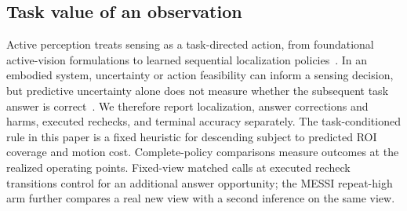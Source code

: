 

\subsection{Task value of an observation}
Active perception treats sensing as a task-directed action, from foundational active-vision formulations to learned sequential localization policies~\cite{bajcsy1988active,aloimonos1988active,caicedo2015active}. In an embodied system, uncertainty or action feasibility can inform a sensing decision, but predictive uncertainty alone does not measure whether the subsequent task answer is correct~\cite{ren2023knowno,guo2017calibration,ovadia2019can}. We therefore report localization, answer corrections and harms, executed rechecks, and terminal accuracy separately. The task-conditioned rule in this paper is a fixed heuristic for descending subject to predicted ROI coverage and motion cost. Complete-policy comparisons measure outcomes at the realized operating points. Fixed-view matched calls at executed recheck transitions control for an additional answer opportunity; the MESSI repeat-high arm further compares a real new view with a second inference on the same view.

